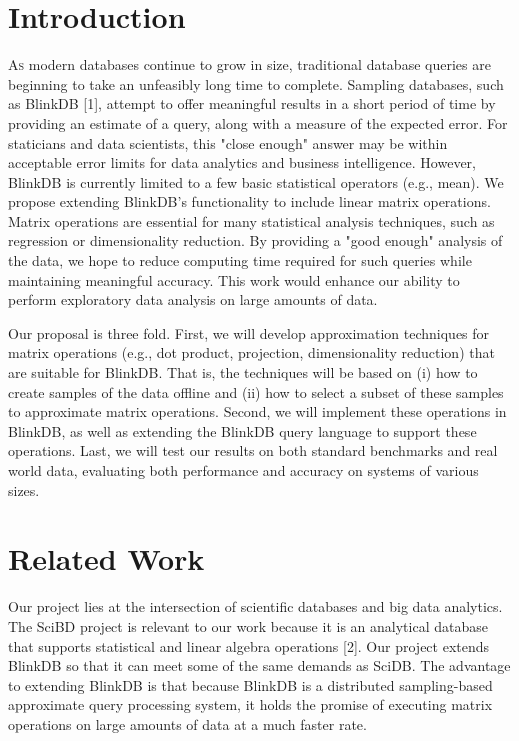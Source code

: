 \documentclass[twoside]{article}
\begin{document}
\begin{multicols}{2} %

\section{Introduction}

\lettrine[nindent=0em,lines=3]{A}s modern databases continue to grow in size, traditional database queries are beginning to take an unfeasibly long time to complete. Sampling databases, such as BlinkDB [1], attempt to offer meaningful results in a short period of time by providing an estimate of a query, along with a measure of the expected error. For staticians and data scientists, this "close enough"  answer may be within acceptable error limits for data analytics and business intelligence. However, BlinkDB is currently limited to a few basic statistical operators (e.g., mean). We propose extending BlinkDB's functionality to include linear matrix operations. Matrix operations are essential for many statistical analysis techniques, such as regression or dimensionality reduction. By providing a "good enough" analysis of the data, we hope to reduce computing time required for such queries while maintaining meaningful accuracy. This work would enhance our ability to perform exploratory data analysis on large amounts of data.

Our proposal is three fold. First, we will develop approximation techniques for matrix operations (e.g., dot product, projection, dimensionality reduction) that are suitable for BlinkDB. That is, the techniques will be based on (i) how to create samples of the data offline and (ii) how to select a subset of these samples to approximate matrix operations. Second, we will implement these operations in BlinkDB, as well as extending the BlinkDB query language to support these operations. Last, we will test our results on both standard benchmarks and real world data, evaluating both performance and accuracy on systems of various sizes.


\section{Related Work}

Our project lies at the intersection of scientific databases and big data analytics. The SciBD project is relevant to our work because it is an analytical database that supports statistical and linear algebra operations [2]. Our project extends BlinkDB so that it can meet some of the same demands as SciDB. The advantage to extending BlinkDB is that because BlinkDB is a distributed sampling-based approximate query processing system, it holds the promise of executing matrix operations on large amounts of data at a much faster rate.


\end{multicols}
\end{document}
